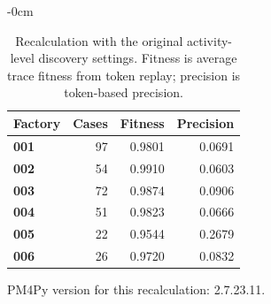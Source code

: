 \begin{table}[!t]\begin{adjustwidth}{-\extralength}{0cm}\centering\caption{Recalculation with the original activity-level discovery settings. Fitness is average trace fitness from token replay; precision is token-based precision.}\label{tab:discovery}
\small\begin{tabular}{@{}lrrr@{}}\toprule Factory & Cases & Fitness & Precision \\ \midrule
\textbf{001} & 97 & 0.9801 & 0.0691 \\
\textbf{002} & 54 & 0.9910 & 0.0603 \\
\textbf{003} & 72 & 0.9874 & 0.0906 \\
\textbf{004} & 51 & 0.9823 & 0.0666 \\
\textbf{005} & 22 & 0.9544 & 0.2679 \\
\textbf{006} & 26 & 0.9720 & 0.0832 \\
\bottomrule\end{tabular}\end{adjustwidth}\end{table}
\FloatBarrier
PM4Py version for this recalculation: 2.7.23.11.
